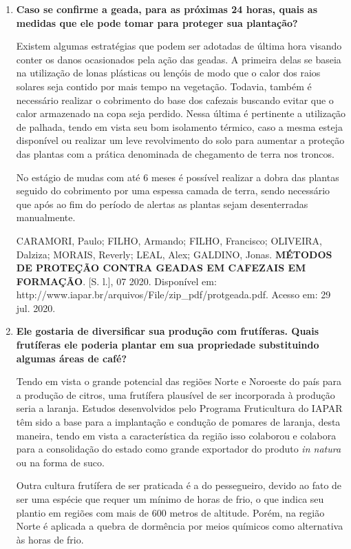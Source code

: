 \documentclass[a4paper, 12pt, brazilian]{article}
\begin{document}
\begin{enumerate}
		\item\textbf{Caso se confirme a geada, para as próximas 24 horas, quais as medidas que ele pode tomar para proteger sua plantação?}
		
		\hspace{.5cm}Existem algumas estratégias que podem ser adotadas de última hora visando conter os danos ocasionados pela ação das geadas. A primeira delas se baseia na utilização de lonas plásticas ou lençóis de modo que o calor dos raios solares seja contido por mais tempo na vegetação. Todavia, também é necessário realizar o cobrimento do base dos cafezais buscando evitar que o calor armazenado na copa seja perdido. Nessa última é pertinente a utilização de palhada, tendo em vista seu bom isolamento térmico, caso a mesma esteja disponível ou realizar um leve revolvimento do solo para aumentar a proteção das plantas com a prática denominada de chegamento de terra nos troncos.
		
		\hspace{.5cm}No estágio de mudas com até 6 meses é possível realizar a dobra das plantas seguido do cobrimento por uma espessa camada de terra, sendo necessário que após ao fim do período de alertas as plantas sejam desenterradas manualmente.
		
		CARAMORI, Paulo; FILHO, Armando; FILHO, Francisco; OLIVEIRA, Dalziza; MORAIS, Reverly; LEAL, Alex; GALDINO, Jonas. \textbf{MÉTODOS DE PROTEÇÃO CONTRA GEADAS EM CAFEZAIS EM FORMAÇÃO}. [S. l.], 07 2020. Disponível em: http://www.iapar.br/arquivos/File/zip\_pdf/protgeada.pdf. Acesso em: 29 jul. 2020.
		
		\item\textbf{Ele gostaria de diversificar sua produção com frutíferas. Quais frutíferas ele poderia plantar em sua propriedade substituindo algumas áreas de café?}
		
		\hspace{.5cm}Tendo em vista o grande potencial das regiões Norte e Noroeste do país para a produção de citros, uma frutífera plausível de ser incorporada à produção seria a laranja. Estudos desenvolvidos pelo Programa Fruticultura do IAPAR têm sido a base para a implantação e condução de pomares de laranja, desta maneira, tendo em vista a característica da região isso colaborou e colabora para a consolidação do estado como grande exportador do produto \textit{in natura} ou na forma de suco.
		
		\hspace{.5cm}Outra cultura frutífera de ser praticada é a do pessegueiro, devido ao fato de ser uma espécie que requer um mínimo de horas de frio, o que indica seu plantio em regiões com mais de 600 metros de altitude. Porém, na região Norte é aplicada a quebra de dormência por meios químicos como alternativa às horas de frio.
		

\end{enumerate}
\end{document}
